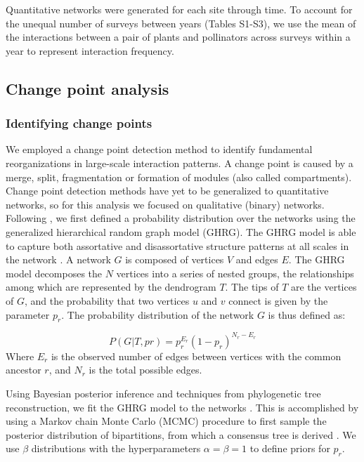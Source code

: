 \documentclass[12pt]{article}
\begin{document}
Quantitative networks were generated for each site through time. To
account for the unequal number of surveys between years (Tables
S1-S3), we use the mean of the interactions between a pair of plants
and pollinators across surveys within a year to represent interaction
frequency.

\subsection*{Change point analysis}
\subsubsection*{Identifying change points}
We employed a change point detection method \citep{peel2014detecting}
to identify fundamental reorganizations in large-scale interaction
patterns. A change point is caused by a merge, split, fragmentation or
formation of modules (also called compartments). Change point
detection methods have yet to be generalized to quantitative networks,
so for this analysis we focused on qualitative (binary)
networks. Following \cite{peel2014detecting}, we first defined a
probability distribution over the networks using the generalized
hierarchical random graph model (GHRG). The GHRG model is able to
capture both assortative and disassortative structure patterns at all
scales in the network \citep{peel2014detecting}. A network $G$ is
composed of vertices $V$ and edges $E$. The GHRG model decomposes the
$N$ vertices into a series of nested groups, the relationships among
which are represented by the dendrogram $T$. The tips of $T$ are the
vertices of $G$, and the probability that two vertices $u$ and $v$
connect is given by the parameter $p_r$. The probability distribution
of the network $G$ is thus defined as:

\begin{equation}
  \label{eq:lik}
  P(G|T,{pr}) = p_r^{E_r}(1-p_r)^{N_r-E_r}
\end{equation}
% 
Where $E_r$ is the observed number of edges between vertices with the
common ancestor $r$, and $N_r$ is the total possible edges.

Using Bayesian posterior inference and techniques from phylogenetic
tree reconstruction, we fit the GHRG model to the networks
\citep{peel2014detecting}. This is accomplished by using a Markov
chain Monte Carlo (MCMC) procedure to first sample the posterior
distribution of bipartitions, from which a consensus tree is derived
\citep{peel2014detecting}. We use $\beta$ distributions with the
hyperparameters $\alpha=\beta=1$ to define priors for $p_r$.
\end{document}
